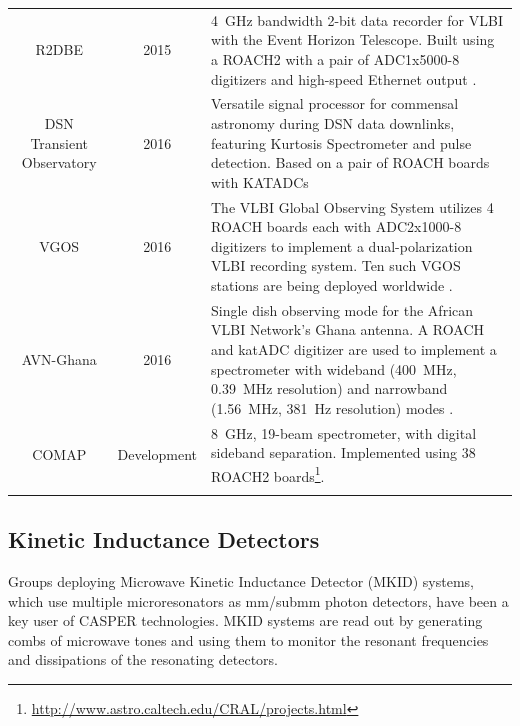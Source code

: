 \documentclass{ws-jai}
\begin{document}
\begin{longtable}{ccp{10cm}}
  R2DBE            & 2015 & 4~GHz bandwidth 2-bit data recorder for VLBI with the Event Horizon Telescope. Built using a ROACH2 with a pair of ADC1x5000-8 digitizers and high-speed Ethernet output \citep{r2dbe}. \\
  DSN Transient Observatory & 2016 & Versatile signal processor for commensal astronomy during DSN data downlinks, featuring Kurtosis Spectrometer and pulse detection. Based on a pair of ROACH boards with KATADCs \citep{dsn-transient-observatory} \\
  VGOS             & 2016 & The VLBI Global Observing System utilizes 4 ROACH boards each with ADC2x1000-8 digitizers to implement a dual-polarization VLBI recording system. Ten such VGOS stations are being deployed worldwide \citep{2012ivs..conf....8H}.\\
  AVN-Ghana        & 2016 & Single dish observing mode for the African VLBI Network's Ghana antenna. A ROACH and katADC digitizer are used to implement a spectrometer with wideband (400~MHz, 0.39~MHz resolution) and narrowband (1.56~MHz, 381~Hz resolution) modes \citep{avn}.\\
  COMAP            & Development & 8~GHz, 19-beam spectrometer, with digital sideband separation. Implemented using 38 ROACH2 boards\footnote{\url{http://www.astro.caltech.edu/CRAL/projects.html}}. \\
  \label{table:casper-instruments-spectrometers}
\end{longtable}

\subsection{Kinetic Inductance Detectors}

Groups deploying Microwave Kinetic Inductance Detector (MKID) systems, which use multiple microresonators as mm/submm photon detectors, have been a key user of CASPER technologies. MKID systems are read out by generating combs of microwave tones and using them to monitor the resonant frequencies and dissipations of the resonating detectors.
\end{document}
